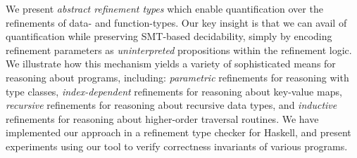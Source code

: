We present \emph{abstract refinement types} which enable 
quantification over the refinements of data- and 
function-types. Our key insight is that we 
can avail of quantification while preserving SMT-based 
decidability, simply by encoding refinement parameters
as \emph{uninterpreted} propositions within the 
refinement logic.
%
We illustrate how this mechanism yields a variety 
of sophisticated means for reasoning about programs, including:
\emph{parametric} refinements for reasoning with 
type classes,
\emph{index-dependent} refinements for reasoning about 
key-value maps,
\emph{recursive} refinements for reasoning about 
recursive data types, and
\emph{inductive} refinements for reasoning about 
higher-order traversal routines.
%
We have implemented our approach in a refinement
type checker for Haskell, and present experiments using our tool
to verify correctness invariants of various programs.
